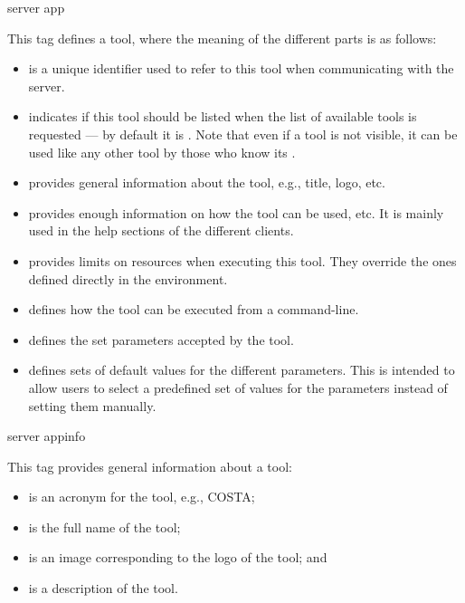 \bigskip
\xmlstruct
{server}
{app}
{%
%
  This tag defines a tool, where the meaning of the different
  parts is as follows:
%
  \begin{itemize}

  \item {} is a unique identifier used to refer to
    this tool when communicating with the server.

  \item {} indicates if this tool should
    be listed when the list of available tools is requested ---
    by default it is . 
    Note that even if a tool is not visible, it can be used
    like any other tool by those who know its
    .

  \item {} provides general information
    about the tool, e.g., title, logo, etc.

  \item {} provides enough information on how the
    tool can be used, etc. It is mainly used in the help
    sections of the different clients.

  \item {} provides limits on resources
    when executing this tool. They override the ones defined directly
    in the  environment.

  \item {} defines how the tool can be
    executed from a command-line.

  \item {} defines the set parameters accepted
    by the tool.

  \item {} defines sets of default values
    for the different parameters. This is intended to allow users to
    select a predefined set of values for the parameters instead of
    setting them manually.

  \end{itemize}
%
}



\bigskip
\xmlstruct
{server}
{appinfo}
{%
%
  This tag provides general information about a tool:
%
  \begin{itemize}
  \item {} is an acronym for the tool,
    e.g., COSTA;
  \item {} is the full name of the tool;
  \item {} is an image corresponding to the logo of
    the tool; and
  \item {} is a description of the tool.
  \end{itemize}
%
}



